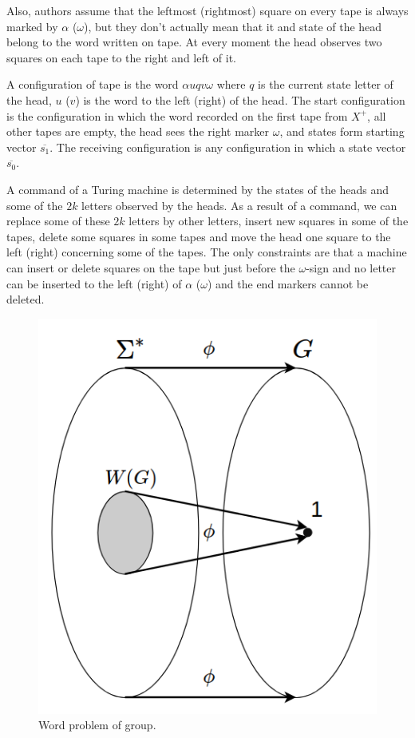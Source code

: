 \documentclass[conference]{IEEEtran}
\theoremstyle{definition}
\begin{document}
Also, authors assume that the leftmost (rightmost) square on every tape is always marked by $\alpha$ ($\omega$), but they don't actually mean that it and state of the head belong to the word written on tape. At every moment the head
observes two squares on each tape to the right and left of it.

A configuration of tape is the word $\alpha u q v \omega$ where $q$ is the current
state letter of the head, $u$ ($v$) is the word to the left (right) of the head.
The start configuration is the configuration in which the word recorded on the first tape from
$ X^+ $, all other tapes are empty, the head sees the right marker $ \omega $, and states form
starting vector $\overline{s_1}$. The receiving configuration is any configuration in which a state vector
$\overline{s_0}$.

A command of a Turing machine is determined by the states of the heads and some of the
$2k$ letters observed by the heads.
As a result of a command, we can replace some of these $2k$ letters by other letters,
insert new squares in some of the tapes, delete some squares in some tapes and move
the head one square to the left (right) concerning some of the tapes.
The only constraints are that a machine can insert or delete squares on the tape
but just before the $\omega$-sign and no letter can be inserted to the left (right)
of $\alpha$ ($\omega$) and the end markers cannot be deleted.

\begin{figure}[tp]
\centerline{\includegraphics[width=0.6\linewidth]{pics/3.png}}
\caption{Word problem of group.}
\label{fig:word_problem}
\end{figure}
\end{document}
